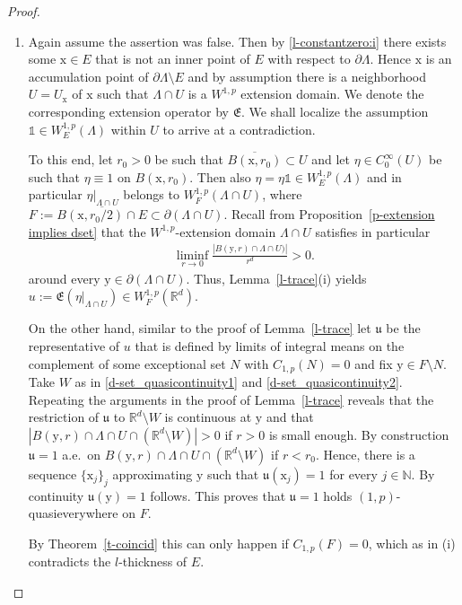 \documentclass[10pt,leqno]{amsart}
\theoremstyle{definition}
\numberwithin{equation}{section}
\begin{document}
\begin{proof}
\begin{enumerate}
  \item Again assume the assertion was false. Then by \ref{l-constantzero:i}
	there exists some ${{\mathrm x}} \in E$ that is not an inner point of $E$ with
	respect to $\partial \Lambda$. Hence ${{\mathrm x}}$ is an accumulation point of
	$\partial \Lambda \setminus E$ and by assumption there is a neighborhood
	$U = U_{{\mathrm x}}$ of ${{\mathrm x}}$ such that $\Lambda \cap U$ is a $W^{1,p}$ extension
	domain. We denote the corresponding extension operator by
	$\mathfrak{E}$.
	We shall localize the assumption $\mathds{1} \in W_E^{1,p}(\Lambda)$
	within $U$ to arrive at a contradiction.

	To this end, let $r_0 > 0$ be such that $\overline{B({{\mathrm x}},r_0)} \subset
	U$ and let $\eta \in C_0^\infty(U)$ be such that $\eta \equiv 1$ on
	$B({{\mathrm x}},r_0)$. Then also $\eta = \eta \mathds{1}	\in
	W_E^{1,p}(\Lambda)$ and in particular $\eta|_{\Lambda \cap U}$
	belongs to $W_F^{1,p}(\Lambda \cap U)$, where $F :=
	\overline{B({{\mathrm x}},r_0/2) \cap E} \subset \partial(\Lambda \cap U)$. Recall
	from Proposition~\ref{p-extension implies dset} that the
	$W^{1,p}$-extension domain $\Lambda \cap U$ satisfies in particular
	\begin{align*}
	  \liminf_{r \to 0} \frac {|B(\mathrm y,r) \cap \Lambda \cap U)|}{r^d} >
	  0.
	\end{align*} 
	around every ${{\mathrm y}} \in \partial(\Lambda \cap U)$. Thus,
	Lemma~\ref{l-trace}(i) yields
	$u:=\mathfrak{E}(\eta|_{\Lambda \cap U}) \in W_F^{1,p}({{\mathbb R}}^d)$.

	On the other hand, similar to the proof of Lemma~\ref{l-trace}
	let ${{\mathfrak u}}$ be the representative of $u$ that is defined by limits of
	integral means on the complement of some exceptional set $N$ with
	$C_{1,p}(N) = 0$ and fix ${{\mathrm y}} \in F \setminus N$. Take $W$ as in
	\eqref{d-set_quasicontinuity1} and
	\eqref{d-set_quasicontinuity2}. Repeating the arguments in the proof of
	Lemma~\ref{l-trace} reveals that the restriction of ${{\mathfrak u}}$ to ${{\mathbb R}}^d
	\setminus W$ is continuous at ${{\mathrm y}}$ and that $|B({{\mathrm y}},r) \cap \Lambda \cap
	U \cap ({{\mathbb R}}^d \setminus W)| > 0$ if $r>0$ is small enough. By
	construction ${{\mathfrak u}} = 1$ a.e.\ on $B({{\mathrm y}},r) \cap \Lambda \cap U \cap ({{\mathbb R}}^d
	\setminus W)$ if $r < r_0$. Hence, there is a sequence
	$\{{{\mathrm x}}_j\}_j$ approximating ${{\mathrm y}}$ such that ${{\mathfrak u}}({{\mathrm x}}_j) = 1$ for every $j
	\in {{\mathbb N}}$. By continuity ${{\mathfrak u}}({{\mathrm y}}) = 1$ follows. This proves that ${{\mathfrak u}} = 1$
	holds $(1,p)$-quasieverywhere on $F$. 

	By Theorem~\ref{t-coincid} this can only happen if $C_{1,p}(F) = 0$,
	which as in (i) contradicts the $l$-thickness of $E$. \qedhere
\end{enumerate}
\end{proof}
\end{document}
